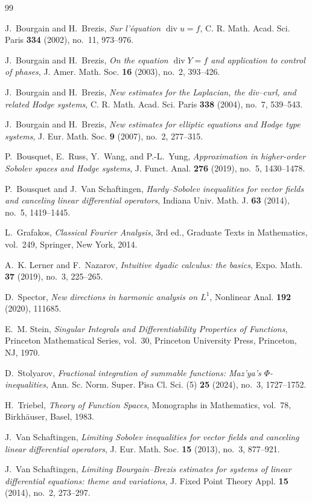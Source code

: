 \documentclass[11pt]{amsart}
\numberwithin{equation}{section}
\theoremstyle{definition}
\theoremstyle{remark}
\begin{document}
\raggedbottom
\begin{thebibliography}{99}

J.~Bourgain and H.~Brezis,
\emph{Sur l'\'equation $\operatorname{div}u=f$},
C. R. Math. Acad. Sci. Paris \textbf{334} (2002), no.~11, 973--976.

J.~Bourgain and H.~Brezis,
\emph{On the equation $\operatorname{div}Y=f$ and application to control of phases},
J. Amer. Math. Soc. \textbf{16} (2003), no.~2, 393--426.

J.~Bourgain and H.~Brezis,
\emph{New estimates for the Laplacian, the div--curl, and related Hodge systems},
C. R. Math. Acad. Sci. Paris \textbf{338} (2004), no.~7, 539--543.

J.~Bourgain and H.~Brezis,
\emph{New estimates for elliptic equations and Hodge type systems},
J. Eur. Math. Soc. \textbf{9} (2007), no.~2, 277--315.

P.~Bousquet, E.~Russ, Y.~Wang, and P.-L.~Yung,
\emph{Approximation in higher-order Sobolev spaces and Hodge systems},
J. Funct. Anal. \textbf{276} (2019), no.~5, 1430--1478.

P.~Bousquet and J.~Van Schaftingen,
\emph{Hardy--Sobolev inequalities for vector fields and canceling linear differential operators},
Indiana Univ. Math. J. \textbf{63} (2014), no.~5, 1419--1445.

L.~Grafakos,
\emph{Classical Fourier Analysis},
3rd ed., Graduate Texts in Mathematics, vol.~249, Springer, New York, 2014.

A.~K. Lerner and F.~Nazarov,
\emph{Intuitive dyadic calculus: the basics},
Expo. Math. \textbf{37} (2019), no.~3, 225--265.

D.~Spector,
\emph{New directions in harmonic analysis on $L^1$},
Nonlinear Anal. \textbf{192} (2020), 111685.

E.~M. Stein,
\emph{Singular Integrals and Differentiability Properties of Functions},
Princeton Mathematical Series, vol.~30, Princeton University Press, Princeton, NJ, 1970.

D.~Stolyarov,
\emph{Fractional integration of summable functions: Maz'ya's $\Phi$-inequalities},
Ann. Sc. Norm. Super. Pisa Cl. Sci. (5) \textbf{25} (2024), no.~3, 1727--1752.

H.~Triebel,
\emph{Theory of Function Spaces},
Monographs in Mathematics, vol.~78, Birkh\"auser, Basel, 1983.

J.~Van Schaftingen,
\emph{Limiting Sobolev inequalities for vector fields and canceling linear differential operators},
J. Eur. Math. Soc. \textbf{15} (2013), no.~3, 877--921.

J.~Van Schaftingen,
\emph{Limiting Bourgain--Brezis estimates for systems of linear differential equations: theme and variations},
J. Fixed Point Theory Appl. \textbf{15} (2014), no.~2, 273--297.

\end{thebibliography}
\end{document}
